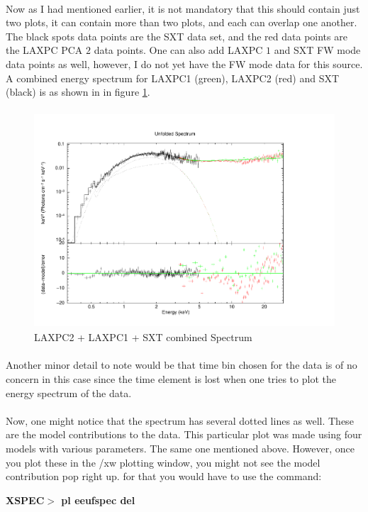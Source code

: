 \documentclass[a4paper,twoside]{report}
\numberwithin{equation}{section}
\begin{document}
\paragraph{}
Now as I had mentioned earlier, it is not mandatory that this should contain just two plots, it can contain more than two plots, and each can overlap one another. The black spots data points are the SXT data set, and the red data points are the LAXPC PCA $2$ data points. One can also add LAXPC $1$ and SXT FW mode data points as well, however, I do not yet have the FW mode data for this source. A combined energy spectrum for LAXPC1 (green), LAXPC2 (red) and SXT (black) is as shown in in figure \ref{LAXPC1+2+SXT combined spec}.\newpage
\paragraph{}
\begin{figure}[h]
\begin{center}
\includegraphics[width=0.8\linewidth, height=8cm]{tbabs_bbody_pow_SXT_laxpc1-2.pdf}
\caption{LAXPC2 + LAXPC1 + SXT combined Spectrum}
\label{LAXPC1+2+SXT combined spec}
\end{center}
\end{figure}
\paragraph{}
Another minor detail to note would be that time bin chosen for the data is of no concern in this case since the time element is lost when one tries to plot the energy spectrum of the data. 
\paragraph{}
Now, one might notice that the spectrum has several dotted lines as well. These are the model contributions to the data. This particular plot was made using four models with various parameters. The same one mentioned above. However, once you plot these in the /xw plotting window, you might not see the model contribution pop right up. for that you would have to use the command:
\begin{center}
\textbf{XSPEC$>$ pl eeufspec del}
\end{center}
\end{document}
